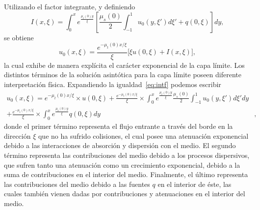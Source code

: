 Utilizando el factor integrante, y definiendo
\begin{equation*}
I(x,\xi) = \int_0^{x} e^{\frac{ \mu_t(0) y}{\xi}}\left[\frac{\mu_s(0)}{2} \int_{-1}^1u_0(y,\xi')d\xi'+q(0,\xi)\right]dy,
\end{equation*}
se obtiene
\begin{equation}
 u_0(x,\xi) = \frac{e^{-\mu_t(0)x/\xi}}{\xi} \Big[\xi u(0,\xi)+I(x,\xi)\Big] ,
 \label{eq:intf}
\end{equation}
la cual exhibe de manera explícita el carácter exponencial 
de la capa límite. Los distintos términos de la solución asintótica 
para la capa límite poseen diferente interpretación física. Expandiendo 
la igualdad~\eqref{eq:intf} podemos escribir
\begin{equation}
\begin{aligned}
 u_0(x,\xi) =   e^{-\mu_t(0)x/\xi}\times u(0,\xi) + \frac{e^{-\mu_t(0)x/\xi}}{\xi} \times  \int_0^{x} e^{\frac{ \mu_t(0) y}{\xi}} \frac{\mu_s(0)}{2} \int_{-1}^1u_0(y,\xi')d\xi'dy&\\
 + \frac{e^{-\mu_t(0)x/\xi}}{\xi} \times \int_0^{x} e^{\frac{ \mu_t(0) y}{\xi}}  q(0,\xi) dy&,
 \label{eq:intfexpandida}
\end{aligned}
\end{equation}
donde el primer término representa el flujo entrante a través del borde en la dirección $\xi$ 
que no ha sufrido colisiones, el cual posee una atenuación exponencial 
debido a las interacciones de absorción y dispersión con el medio. El segundo término representa las contribuciones 
del medio debido a los procesos dispersivos, que sufren tanto una atenuación 
como un crecimiento exponencial, debido a la suma de contribuciones en el interior del medio. Finalmente, el último representa 
las contribuciones del medio debido a las fuentes $q$ en el interior de éste, 
las cuales también vienen dadas por contribuciones y atenuaciones en el interior del medio.


